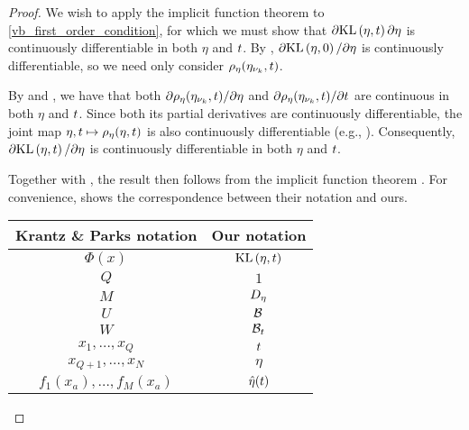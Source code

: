 \begin{thm}
\begin{proof}
We wish to apply the implicit function theorem to
\eqref{vb_first_order_condition}, for which we must show that $\partial
\mathrm{KL}\left(\eta, t\right) \partial \eta$ is continuously differentiable in both $\eta$ and
$t$.  By , $\partial \mathrm{KL}\left(\eta, 0\right) /
\partial \eta$ is continuously differentiable, so we need only consider
$\rho_\eta(\eta_{\nu_{k}}, t)$.

By  and , we
have that both $\partial \rho_\eta(\eta_{\nu_{k}}, t) / \partial \eta$ and $\partial
\rho_\eta(\eta_{\nu_{k}}, t) / \partial t$ are continuous in both $\eta$ and $t$.
Since both its partial derivatives are continuously differentiable, the joint
map $\eta, t \mapsto \rho_\eta(\eta, t)$ is also continuously differentiable
(e.g., \citet[Theorem 3.2]{fleming:2012:functions}).  Consequently, $\partial
\mathrm{KL}\left(\eta, t\right) / \partial \eta$ is continuously differentiable in both $\eta$ and
$t$.


Together with , the result then follows from the
implicit function theorem \citet[Theorem 3.3.1]{krantz:2012:implicit}.
For convenience,  shows the correspondence between
their notation and ours.

\begin{center}
\begin{tabular}{|c|c|}
%
\hline Krantz \& Parks notation & Our notation \\\hline
$\Phi(x)$                       & $\mathrm{KL}\left(\eta, t\right)$ \\\hline
$Q$                             & $1$ \\\hline
$M$                             & ${D_{\eta}}$ \\\hline
$U$                             & $\mathcal{B}$ \\\hline
$W$                             & $\mathcal{B}_t$ \\\hline
$x_1,\ldots,x_Q$                & $t$ \\\hline
$x_{Q+1},\ldots,x_N$            & $\eta$ \\\hline
$f_1(x_a), \ldots,f_M(x_a)$     & $\hat\eta(t)$ \\\hline
%
\end{tabular}
\end{center}
%
\end{proof}


\end{thm}
